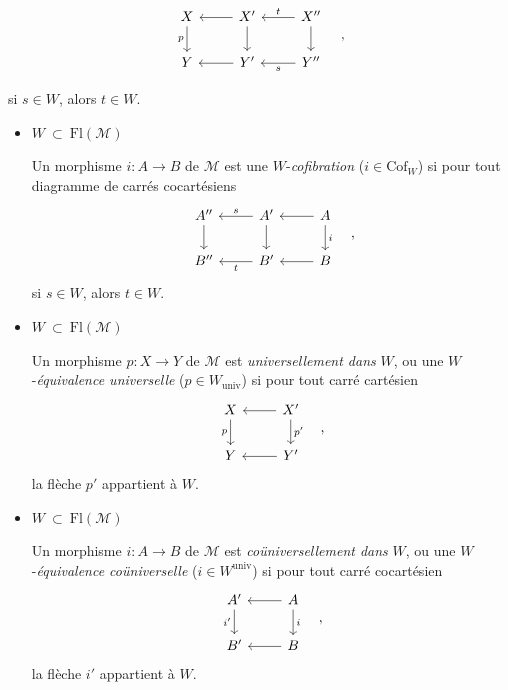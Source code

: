 \documentclass[11pt]{article}
\newcommand{\printedpage}[1]{\marginpar{\footnotesize p.~#1}}
\newcommand{\Fl}{\mathrm{Fl}}
\newcommand{\Mo}{\mathcal{M}}
\begin{document}
\printedpage{59}

\[
\begin{tikzcd}
X \arrow[d, "p"'] & X' \arrow[l] \arrow[d] & X'' \arrow[l, "t"'] \arrow[d] \\
Y & Y' \arrow[l] & Y'' \arrow[l, "s"]
\end{tikzcd}
\quad ,
\]

si $s \in W$, alors $t \in W$.

\begin{itemize}
\item[\textbullet] $W \ \subset\ \Fl(\Mo)$

Un morphisme $i : A \longrightarrow B$ de $\Mo$ est une $W$-\textit{cofibration} ($i \in \mathrm{Cof}_W$) si pour tout diagramme de carrés cocartésiens
\[
\begin{tikzcd}
A'' \arrow[d] & A' \arrow[l, "s"'] \arrow[d] & A \arrow[l] \arrow[d, "i"] \\
B'' & B' \arrow[l, "t"] & B \arrow[l]
\end{tikzcd}
\quad ,
\]
si $s \in W$, alors $t \in W$.

\item[\textbullet] $W \ \subset\ \Fl(\Mo)$

Un morphisme $p : X \longrightarrow Y$ de $\Mo$ est \textit{universellement dans} $W$, ou une $W$-\textit{équivalence universelle} ($p \in W_{\mathrm{univ}}$) si pour tout carré cartésien
\[
\begin{tikzcd}
X \arrow[d, "p"'] & X' \arrow[l] \arrow[d, "p'"] \\
Y & Y' \arrow[l]
\end{tikzcd}
\quad ,
\]
la flèche $p'$ appartient à $W$.

\item[\textbullet] $W \ \subset\ \Fl(\Mo)$

Un morphisme $i : A \longrightarrow B$ de $\Mo$ est \textit{coüniversellement dans} $W$, ou une $W$-\textit{équivalence coüniverselle} ($i \in W^{\mathrm{univ}}$) si pour tout carré cocartésien
\[
\begin{tikzcd}
A' \arrow[d, "i'"'] & A \arrow[l] \arrow[d, "i"] \\
B' & B \arrow[l]
\end{tikzcd}
\quad ,
\]
la flèche $i'$ appartient à $W$.
\end{itemize}

\printedpage{60}
\end{document}

